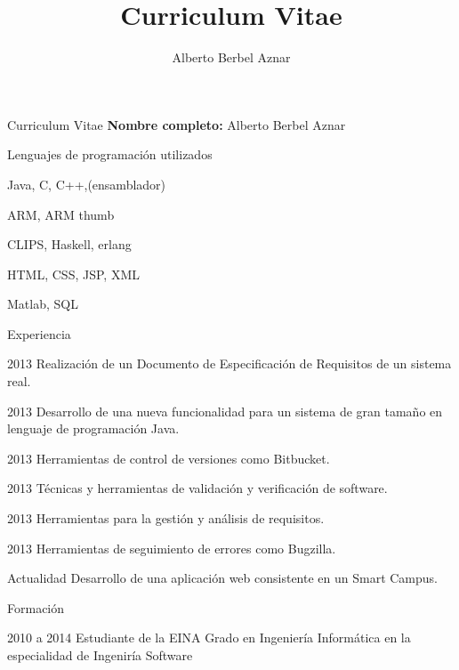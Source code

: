 \documentclass[letterpaper,12pt]{article}
\title{Curriculum Vitae}
\author{Alberto Berbel Aznar }
\begin{document}
\setlength{\cvlabelwidth}{40mm}  %

\begin{cv}{Curriculum Vitae}
\vspace{1cm}
\textbf{Nombre completo:} Alberto Berbel Aznar
\vspace{1cm}

\begin{cvlist}{Lenguajes de programaci\'on utilizados}
\item Java, C, C++,(ensamblador)
\item ARM, ARM thumb
\item CLIPS, Haskell, erlang
\item HTML, CSS, JSP, XML
\item Matlab, SQL
\end{cvlist}

\begin{cvlist}{Experiencia}

	\item[2013] Realizaci\'on de un Documento de Especificaci\'on de Requisitos 
				de un sistema real.
	
	\item[2013] Desarrollo de una nueva funcionalidad para un sistema de gran 
				tama\~no en lenguaje de programaci\'on Java.
	
	\item[2013] Herramientas de control de versiones como Bitbucket.
	
	\item[2013] T\'ecnicas y herramientas de validaci\'on y verificaci\'on de software.
	
	\item[2013] Herramientas para la gesti\'on y an\'alisis de requisitos.
	
	\item[2013] Herramientas de seguimiento de errores como Bugzilla.
	
	\item[Actualidad] Desarrollo de una aplicaci\'on web consistente en un Smart Campus.

\end{cvlist}

\begin{cvlist}{Formaci\'on}

	\item[2010 a 2014] Estudiante de la EINA
		Grado en Ingenier\'ia Inform\'atica en la especialidad de Ingenir\'ia Software


\end{cvlist}

\end{cv}
\end{document}

